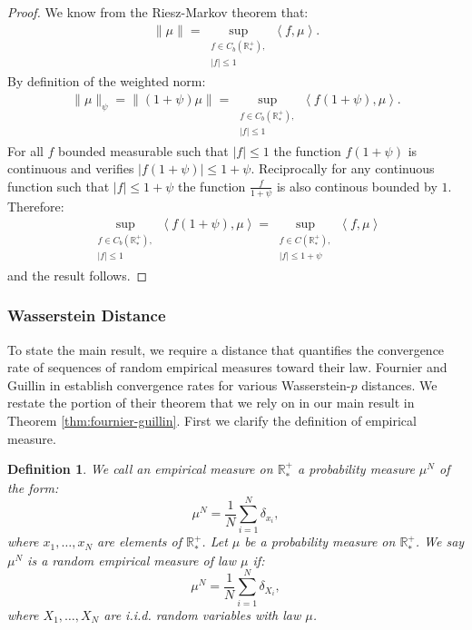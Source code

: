 \documentclass[11pt,a4paper]{article}
\newcommand{\RRP}{\mathbb{R}^+_*}
\newcommand{\brac}[1]{\left\langle#1\right\rangle}
\newtheorem{definition}[theorem]{Definition}
\begin{document}
\begin{proof}
    We know from the Riesz-Markov theorem that:
    \begin{align*}
        \|\mu\| = \sup\limits_{\substack{f \in C_b(\RRP), \\|f| \leq 1}}\brac{f,\mu}.
    \end{align*}
    By definition of the weighted norm:
    \begin{align*}
        \|\mu\|_{\psi} = \|(1 + \psi)\mu\| = \sup\limits_{\substack{f \in C_b(\RRP), \\ |f| \leq 1}}\brac{f(1 + \psi),\mu}.
    \end{align*}
    For all $f$ bounded measurable such that $|f| \leq 1$ the function $f(1 + \psi)$ is continuous and verifies $|f(1 + \psi)| \leq 1 + \psi$. Reciprocally for any continuous function such that $|f| \leq 1 + \psi$ the function $\frac{f}{1 + \psi}$ is also continous bounded by $1$. Therefore:
    \begin{align*}
        \sup\limits_{\substack{f \in C_b(\RRP), \\|f| \leq 1}}\brac{f(1 + \psi),\mu} = \sup\limits_{\substack{f \in C(\RRP), \\ |f| \leq 1 + \psi}}\brac{f,\mu}
    \end{align*}
    and the result follows.
\end{proof}


\subsubsection*{Wasserstein Distance}
To state the main result, we require a distance that quantifies the convergence rate of sequences of random empirical measures toward their law. Fournier and Guillin in \cite{fournier2015rate} establish convergence rates for various Wasserstein-$p$ distances. We restate the portion of their theorem that we rely on in our main result in Theorem \ref{thm:fournier-guillin}. First we clarify the definition of empirical measure.
\begin{definition}
We call an \emph{empirical measure} on $\RRP$ a probability measure $\mu^N$ of the form:
\[
\mu^N = \dfrac{1}{N} \sum_{i = 1}^N \delta_{x_i},
\]
where $x_1, \dots, x_N$ are elements of $\RRP$. Let $\mu$ be a probability measure on $\RRP$. We say $\mu^N$ is a random empirical measure of \emph{law $\mu$} if:
\[
\mu^N = \dfrac{1}{N} \sum_{i = 1}^N \delta_{X_i},
\]
where $X_1, \dots, X_N$ are i.i.d. random variables with law $\mu$.
\end{definition}
\end{document}
